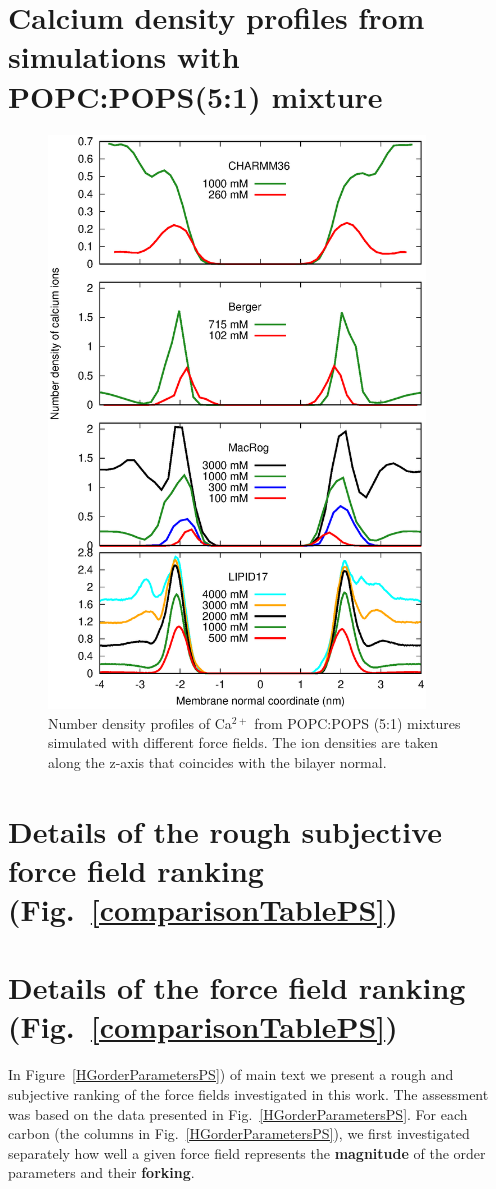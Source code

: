 \documentclass[journal=jpcbfk]{achemso}
\newcommand{\todo}[1]{\textcolor{red}{#1}}
\begin{document}
\section{Calcium density profiles from simulations with \\ POPC:POPS(5:1) mixture}
\begin{figure}[ht]
  \centering
  \includegraphics[width=10cm]{../Figs/CAdensPCPSmixture.eps}
  \caption{\label{CAdensPCPSmixtureALL}
    Number density profiles of Ca$^{2+}$ from POPC:POPS (5:1) mixtures simulated with different force fields. The ion densities are taken along the z-axis that coincides with the bilayer normal. 
  }
\end{figure}

\clearpage
\section{Details of the rough subjective force field ranking (Fig.~\ref{comparisonTablePS})} 

\section{Details of the force field ranking (Fig.~\ref{comparisonTablePS})}\label{Ranking} 
In Figure~\ref{HGorderParametersPS}) of main text we present a rough and subjective ranking of the force fields investigated in this work. 
The assessment was based on the data presented in Fig.~\ref{HGorderParametersPS}.
%
For each carbon (the columns in Fig.~\ref{HGorderParametersPS}),
we first investigated separately how well a given force field represents the {\bf magnitude} of the order parameters and their {\bf forking}.
\end{document}
